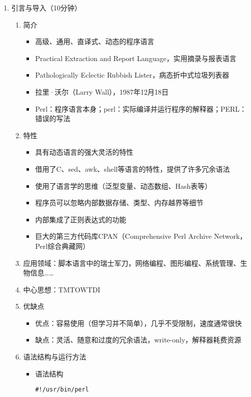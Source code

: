 \documentclass{TIJMUjiaoanLL}
\begin{document}
\firstTail


\newpage
\otherHeader

\begin{enumerate}
  \item 引言与导入（10分钟）
    \begin{enumerate}
      \item 简介
	\begin{itemize}
          \item 高级、通用、直译式、动态的程序语言
          \item Practical Extraction and Report Language，实用摘录与报表语言
          \item Pathologically Eclectic Rubbish Lister，病态折中式垃圾列表器
          \item 拉里·沃尔（Larry Wall），1987年12月18日
          \item Perl：程序语言本身；perl：实际编译并运行程序的解释器；PERL：错误的写法
	\end{itemize}
      \item 特性
	\begin{itemize}
          \item 具有动态语言的强大灵活的特性
          \item 借用了C、sed、awk、shell等语言的特性，提供了许多冗余语法
          \item 使用了语言学的思维（泛型变量、动态数组、Hash表等）
          \item 程序员可以忽略内部数据存储、类型、内存越界等细节
          \item 内部集成了正则表达式的功能
          \item 巨大的第三方代码库CPAN（Comprehensive Perl Archive Network，Perl综合典藏网）
	\end{itemize}
      \item 应用领域：脚本语言中的瑞士军刀，网络编程、图形编程、系统管理、生物信息……
      \item 中心思想：TMTOWTDI
      \item 优缺点
	\begin{itemize}
	  \item 优点：容易使用（但学习并不简单），几乎不受限制，速度通常很快
	  \item 缺点：灵活、随意和过度的冗余语法，write-only，解释器耗费资源
	\end{itemize}
      \item 语法结构与运行方法
	\vspace*{-10pt}
	    \begin{multicols}{2}
	\begin{itemize}
	  \item 语法结构
\begin{verbatim}
#!/usr/bin/perl


\end{verbatim}
\end{itemize}
\end{multicols}
\end{enumerate}
\end{enumerate}
\end{document}
